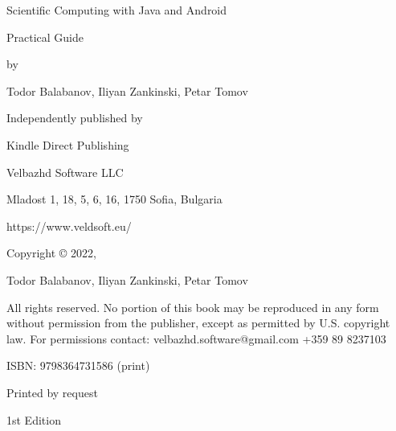 \newpage

Scientific Computing with Java and Android

Practical Guide

by

Todor Balabanov, Iliyan Zankinski, Petar Tomov

\vspace{0.4cm}

Independently published by

Kindle Direct Publishing

\vspace{0.4cm}

Velbazhd Software LLC

Mladost 1, 18, 5, 6, 16, 1750 Sofia, Bulgaria

\vspace{0.4cm}

https://www.veldsoft.eu/

\vspace{0.4cm}

Copyright © 2022,

Todor Balabanov, Iliyan Zankinski, Petar Tomov

\vspace{0.4cm}

All rights reserved. No portion of this book may be reproduced in any form without permission from the publisher, except as permitted by U.S. copyright law. For permissions contact: velbazhd.software@gmail.com +359 89 8237103

\vspace{0.4cm}

ISBN: 9798364731586 (print)

Printed by request

1st Edition
